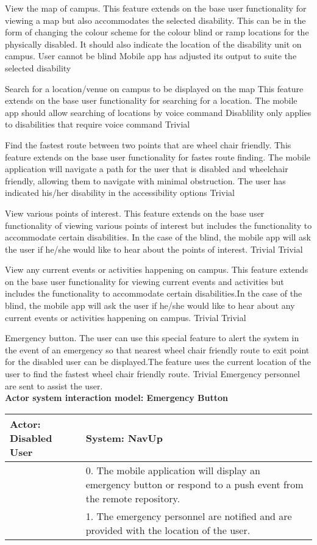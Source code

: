 \FuncReq
{View the map of campus.}
{This feature extends on the base user functionality for viewing a map but also accommodates the selected disability. This can be in the form of changing the colour scheme for the colour blind or ramp locations for the physically disabled. It should also indicate the location of the disability unit on campus.}
{User cannot be blind}
{Mobile app has adjusted its output to suite the selected disability}

\FuncReq
{Search for a location/venue on campus to be displayed on the map}
{This feature extends on the base user functionality for searching for a location. The mobile app should allow searching of locations by voice command}
{Disablility only applies to disabilities that require voice command}
{Trivial}

\FuncReq
{Find the fastest route between two points that are wheel chair friendly.}%
{This feature extends on the base user functionality for fastes route finding. The mobile application will navigate a path for the user that is disabled and wheelchair friendly, allowing them to navigate with minimal obstruction.}
{The user has indicated his/her disability in the accessibility options}
{Trivial}

\FuncReq
{View various points of interest.}
{This feature extends on the base user functionality of viewing various points of interest but includes the functionality to accommodate certain disabilities. In the case of the blind, the mobile app will ask the user if he/she would like to hear about the points of interest.}
{Trivial}
{Trivial}

\FuncReq
{View any current events or activities happening on campus.}
{This feature extends on the base user functionality for viewing current events and activities but includes the functionality to accommodate certain disabilities.In the case of the blind, the mobile app will ask the user if he/she would like to hear about any current events or activities happening on campus.}
{Trivial}
{Trivial}

\FuncReq
{Emergency button.}
{The user can use this special feature to alert the system in the event of an emergency so that nearest wheel chair friendly route to exit point for the disabled user can be displayed.The feature uses the current location of the user to find the fastest wheel chair friendly route.}
{Trivial}
{Emergency personnel are sent to assist the user.}
    \\
    \textbf{Actor system interaction model: Emergency Button}\\
    \begin{tabular}{ | p{6cm} | p{6cm} |}
    \hline
    Actor: Disabled User & System: NavUp \\ \hline
      & 0. The mobile application will display an emergency button or respond to a push event from the remote repository.\\ \hline
      & 1. The emergency personnel are notified and are provided with the location of the user.\\ \hline   
    \end{tabular}
\\
\bigskip

